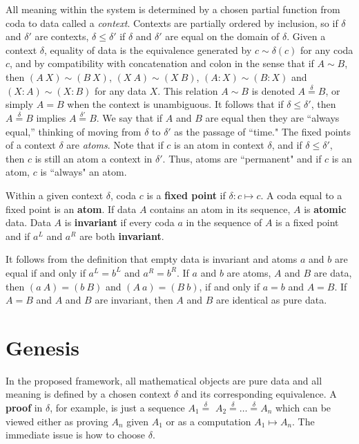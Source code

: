 \documentclass[11pt]{article}
\begin{document}
     All meaning within the system is determined by a chosen partial function from coda to data called a {\it context}. 
Contexts are partially ordered by inclusion, so if $\delta$ and $\delta'$ are contexts, $\delta\le\delta'$ if $\delta$ and $\delta'$ are equal on the domain of $\delta$.  
Given a context $\delta$, equality of data is the equivalence generated by $c\sim \delta(c)$ for any coda $c$, and by compatibility with concatenation and colon in the sense that 
if $A\sim B$, then $(A\ X)\sim (B\ X)$, $(X\ A)\sim (X\ B)$, $(A:X)\sim (B:X)$ and $(X:A)\sim(X:B)$ for any data $X$.  This relation $A\sim B$ is denoted $A{\overset\delta =}B$, 
or simply $A=B$ when the context is unambiguous.   
It follows that if $\delta\leq\delta'$, then $A{\overset\delta =}B$ implies $A{\overset{\delta'} =}B$.  We say that if $A$ and $B$ are equal then they are ``always equal,'' thinking 
of moving from $\delta$ to $\delta'$ as the passage of ``time."  The fixed points of a context $\delta$ are {\it atoms}.  Note that if $c$ is an atom in context $\delta$, 
and if $\delta\leq\delta'$, then $c$ is still an atom a context in $\delta'$.  Thus, atoms are ``permanent" and if $c$ is an atom, $c$ is ``always" an atom.  

\begin{definition}
{Within a given context $\delta$, coda $c$ is a {\bf fixed point} if $\delta:c\mapsto c$.  A coda equal to a fixed point is an {\bf atom}.  If data $A$ contains an atom in its sequence, $A$ is {\bf atomic} data. 
Data $A$ is {\bf invariant} if every coda $a$ in the sequence of $A$ is a fixed point and if $a^L$ and $a^R$ are both {\bf invariant}. }
\end{definition}
\noindent It follows from the definition that empty data is invariant and atoms $a$ and $b$ are equal if and only if $a^L=b^L$ and $a^R=b^R$.  If $a$ and $b$ are atoms, 
$A$ and $B$ are data, then $(a\ A)=(b\ B)$ and $(A\ a)=(B\ b)$, if and only if $a=b$ and $A=B$.  If $A=B$ and $A$ and $B$ are invariant, then $A$ and 
$B$ are identical as pure data.

\section{Genesis}

    In the proposed framework, all mathematical objects are pure data and all meaning is defined by a chosen context $\delta$ and its corresponding equivalence.  
A {\bf proof} in $\delta$, for example, is just a sequence $A_1{\overset \delta =}$ $A_2 {\overset \delta =} \dots {\overset \delta =}$$A_n$ which can be viewed either as proving $A_n$ 
given $A_1$ or as a computation $A_1\mapsto A_n$. 
The immediate issue is how to choose $\delta$.  
    
\end{document}
